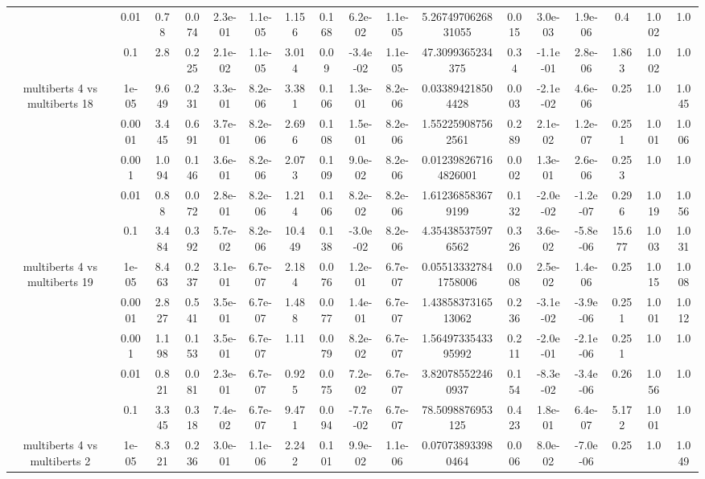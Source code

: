 \begin{tabular}{|c|c|c|c|c|c|c|c|c|c|c|c|c|c|c|c|c|}
 & 0.01 & 0.78 & 0.074 & 2.3e-01 & 1.1e-05 & 1.156 & 0.168 & 6.2e-02 & 1.1e-05 & 5.2674970626831055 & 0.015 & 3.0e-03 & 1.9e-06 & 0.4 & 1.002 & 1.0 \\
 & 0.1 & 2.8 & 0.225 & 2.1e-02 & 1.1e-05 & 3.014 & 0.09 & -3.4e-02 & 1.1e-05 & 47.3099365234375 & 0.34 & -1.1e-01 & 2.8e-06 & 1.863 & 1.002 & 1.0 \\
\hline
\multirow{5}{*}{multiberts 4 vs multiberts 18} & 1e-05 & 9.649 & 0.231 & 3.3e-01 & 8.2e-06 & 3.381 & 0.106 & 1.3e-01 & 8.2e-06 & 0.033894218504428 & 0.003 & -2.1e-02 & 4.6e-06 & 0.25 & 1.0 & 1.045 \\
 & 0.0001 & 3.445 & 0.691 & 3.7e-01 & 8.2e-06 & 2.696 & 0.108 & 1.5e-01 & 8.2e-06 & 1.552259087562561 & 0.289 & 2.1e-02 & 1.2e-07 & 0.251 & 1.001 & 1.006 \\
 & 0.001 & 1.094 & 0.146 & 3.6e-01 & 8.2e-06 & 2.073 & 0.109 & 9.0e-02 & 8.2e-06 & 0.012398267164826001 & 0.002 & 1.3e-01 & 2.6e-06 & 0.253 & 1.0 & 1.0 \\
 & 0.01 & 0.88 & 0.072 & 2.8e-01 & 8.2e-06 & 1.214 & 0.106 & 8.2e-02 & 8.2e-06 & 1.612368583679199 & 0.132 & -2.0e-02 & -1.2e-07 & 0.296 & 1.019 & 1.056 \\
 & 0.1 & 3.484 & 0.392 & 5.7e-02 & 8.2e-06 & 10.449 & 0.138 & -3.0e-02 & 8.2e-06 & 4.354385375976562 & 0.326 & 3.6e-02 & -5.8e-06 & 15.677 & 1.003 & 1.031 \\
\hline
\multirow{5}{*}{multiberts 4 vs multiberts 19} & 1e-05 & 8.463 & 0.237 & 3.1e-01 & 6.7e-07 & 2.184 & 0.076 & 1.2e-01 & 6.7e-07 & 0.055133327841758006 & 0.008 & 2.5e-02 & 1.4e-06 & 0.25 & 1.015 & 1.008 \\
 & 0.0001 & 2.827 & 0.541 & 3.5e-01 & 6.7e-07 & 1.488 & 0.077 & 1.4e-01 & 6.7e-07 & 1.4385837316513062 & 0.236 & -3.1e-02 & -3.9e-06 & 0.251 & 1.001 & 1.012 \\
 & 0.001 & 1.198 & 0.153 & 3.5e-01 & 6.7e-07 & 1.11 & 0.079 & 8.2e-02 & 6.7e-07 & 1.5649733543395992 & 0.211 & -2.0e-01 & -2.1e-06 & 0.251 & 1.0 & 1.0 \\
 & 0.01 & 0.821 & 0.081 & 2.3e-01 & 6.7e-07 & 0.925 & 0.075 & 7.2e-02 & 6.7e-07 & 3.820785522460937 & 0.154 & -8.3e-02 & -3.4e-06 & 0.26 & 1.056 & 1.0 \\
 & 0.1 & 3.345 & 0.318 & 7.4e-02 & 6.7e-07 & 9.471 & 0.094 & -7.7e-02 & 6.7e-07 & 78.5098876953125 & 0.423 & 1.8e-01 & 6.4e-07 & 5.172 & 1.001 & 1.0 \\
\hline
\multirow{5}{*}{multiberts 4 vs multiberts 2} & 1e-05 & 8.321 & 0.236 & 3.0e-01 & 1.1e-06 & 2.242 & 0.101 & 9.9e-02 & 1.1e-06 & 0.070738933980464 & 0.006 & 8.0e-02 & -7.0e-06 & 0.25 & 1.0 & 1.049 \\

\end{tabular}
